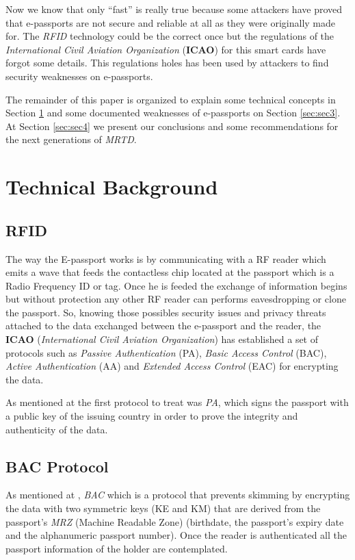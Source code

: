 \documentclass{acm_proc_article-sp}
\begin{document}
Now we know that only “fast” is really true because some attackers have proved that e-passports are not secure and reliable at all as they were originally made for. The \emph{RFID} technology could be the correct once but the regulations of the \emph{International Civil Aviation Organization }(\textbf{ICAO}) for this smart cards have forgot some details. This regulations holes has been used by attackers to find security weaknesses on e-passports.

The remainder of this paper is organized to explain some technical concepts in Section \ref{sec:sec2} and some documented weaknesses of e-passports on Section \ref{sec:sec3}. At Section \ref{sec:sec4} we present our conclusions and some recommendations for the next generations of \emph{MRTD}. 

\section{Technical Background}
\label{sec:sec2}

\subsection{RFID}
The way the E-passport works is by communicating with a RF reader which emits a wave that feeds 
the contactless chip located at the passport which is a Radio Frequency ID or tag. Once he is feeded the exchange of information begins but 
without protection any other RF reader can performs eavesdropping or clone the passport. So, knowing those possibles security issues and privacy threats attached to
the data exchanged between the e-passport and the reader, the \textbf{ICAO} 
(\textit{International Civil Aviation Organization}) has 
established a set of protocols such as \textit{Passive Authentication} (PA), \textit{Basic Access Control} (BAC), 
\textit{Active Authentication} (AA) and \textit{Extended Access Control} (EAC) for encrypting the data.

As mentioned at \cite{NM12} the first protocol to treat was \textit{PA}, which signs the passport with 
a public key of the issuing country in order to prove the integrity and authenticity of the data.

\subsection{BAC Protocol}
As mentioned at \cite{CLPS07}, \textit{BAC} which is a protocol that prevents skimming by encrypting 
the data with two symmetric keys (KE and KM) that are derived from the passport's  
\textit{MRZ} (Machine Readable Zone) (birthdate, the passport’s expiry date and the alphanumeric 
passport number). Once the reader is authenticated all the passport information of the holder are contemplated.
\end{document}
